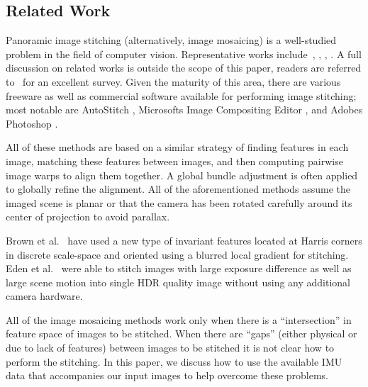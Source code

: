 \documentclass[11pt]{article}
\begin{document}
\subsection{Related Work}
Panoramic image stitching (alternatively, image mosaicing) is a
well-studied problem in the field of computer vision.  Representative
works include~\cite{Milgram1975}, \cite{Milgram1977}, \cite{Capel},
\cite{Szeliski1997} \cite{Brown07} \cite{Brown03}.  A full discussion
on related works is outside the scope of this paper, readers are
referred to~\cite{Szeliski05imagealignment} for an excellent survey.
Given the maturity of this area, there are various freeware as well as
commercial software available for performing image stitching; most
notable are AutoStitch \cite{autostitch}, Microsoft\textsc{}s Image
Compositing Editor \cite{ICE}, and Adobe\textsc{}s Photoshop
\cite{photoshop}.

All of these methods are based on a similar strategy of finding
features in each image, matching these features between images, and
then computing pairwise image warps to align them together.  A global
bundle adjustment is often applied to globally refine the alignment.
All of the aforementioned methods assume the imaged scene is planar or
that the camera has been rotated carefully around its center of
projection to avoid parallax.

Brown et al.~\cite{Brown05} have used a new type of invariant features
located at Harris corners in discrete scale-space and oriented using a
blurred local gradient for stitching. Eden et al.~\cite{Eden} were
able to stitch images with large exposure difference as well as large
scene motion into single HDR quality image without using any
additional camera hardware.

All of the image mosaicing methods work only when there is a
``intersection'' in feature space of images to be stitched. When there
are ``gaps'' (either physical or due to lack of features) between
images to be stitched it is not clear how to perform the stitching. In
this paper, we discuss how to use the available IMU data that
accompanies our input images to help overcome these problems.
\end{document}
